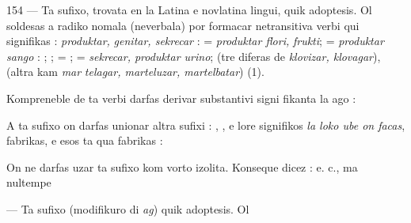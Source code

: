 \begin{VUpage}[158]{154}
 --- Ta sufixo, trovata en la Latina e novlatina lingui,\nl
quik adoptesis. Ol soldesas a radiko nomala (neverbala)\nl
por formacar netransitiva verbi qui signifikas : \textit{produktar,}\nl
\textit{genitar, sekrecar} :  = \textit{produktar flori,}\nl
\textit{frukti};  = \textit{produktar sango} : \nl
{}; ;  = \nl
{};  = \textit{sekrecar, produktar urino}; \nl
{}\nl
(tre diferas de \textit{klovizar, klovagar}),  (altra kam \textit{mar}\cc
\textit{telagar, marteluzar, martelbatar}) (1).

Kompreneble de ta verbi darfas derivar substantivi signi\cc
fikanta la ago : \parplein

A ta sufixo on darfas unionar altra sufixi : , , e\nl
lore  signifikos \textit{la loko ube on facas}, fabrikas, e \nl
esos ta qua fabrikas : \nl
{}

On ne darfas uzar ta sufixo kom vorto izolita. Konseque\nl
dicez :  e. c., ma nultempe \parplein

 --- Ta sufixo (modifikuro di \textit{ag}) quik adoptesis. Ol\parplein
\end{VUpage}

